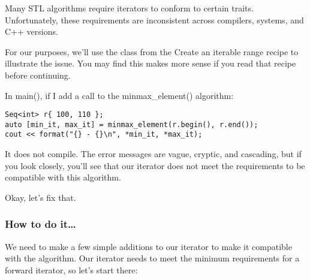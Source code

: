 
Many STL algorithms require iterators to conform to certain traits. Unfortunately, these requirements are inconsistent across compilers, systems, and C++ versions.

For our purposes, we'll use the class from the Create an iterable range recipe to illustrate the issue. You may find this makes more sense if you read that recipe before continuing.

In main(), if I add a call to the minmax\_element() algorithm:

\begin{lstlisting}[style=styleCXX]
Seq<int> r{ 100, 110 };
auto [min_it, max_it] = minmax_element(r.begin(), r.end());
cout << format("{} - {}\n", *min_it, *max_it);
\end{lstlisting}

It does not compile. The error messages are vague, cryptic, and cascading, but if you look closely, you'll see that our iterator does not meet the requirements to be compatible with this algorithm.

Okay, let's fix that.

\subsubsection{How to do it…}

We need to make a few simple additions to our iterator to make it compatible with the algorithm. Our iterator needs to meet the minimum requirements for a forward iterator, so let's start there:


